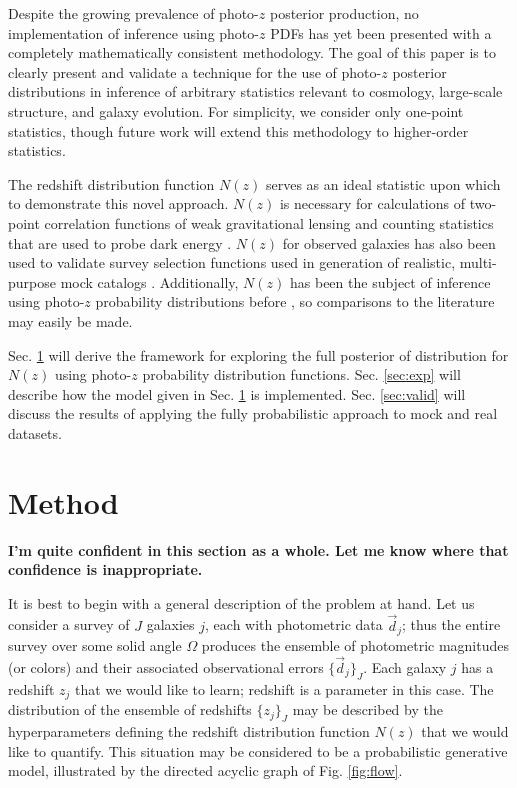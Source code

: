 \documentclass[preprint]{aastex}
\begin{document}
Despite the growing prevalence of photo-$z$ posterior production, no 
implementation of inference using photo-$z$ PDFs has yet been presented with a 
completely mathematically consistent methodology.  The goal of this paper is to 
clearly present and validate a technique for the use of photo-$z$ posterior 
distributions in inference of arbitrary statistics relevant to cosmology, 
large-scale structure, and galaxy evolution.  For simplicity, we consider only 
one-point statistics, though future work will extend this methodology to 
higher-order statistics.

The redshift distribution function $N(z)$ serves as an ideal statistic upon 
which to demonstrate this novel approach.  $N(z)$ is necessary for calculations 
of two-point correlation functions of weak gravitational lensing and counting 
statistics that are used to probe dark energy \citep{Masters2015}.  $N(z)$ for 
observed galaxies has also been used to validate survey selection functions 
used in generation of realistic, multi-purpose mock catalogs 
\citep{Norberg2002}.  Additionally, $N(z)$ has been the subject of inference 
using photo-$z$ probability distributions before \citep{Sheldon2012, 
Hildebrandt2012, Kelly2014, Benjamin2013, Bonnett2015a, Viironen2015, 
Asorey2016, Leistedt2016}, so comparisons to the literature may easily be made. 
 

Sec. \ref{sec:meth} will derive the framework for exploring the full posterior 
of distribution for $N(z)$ using photo-$z$ probability distribution functions.  
Sec. \ref{sec:exp} will describe how the model given in Sec. \ref{sec:meth} is 
implemented.  Sec. \ref{sec:valid} will discuss the results of applying the 
fully probabilistic approach to mock and real datasets.

\clearpage
\section{Method}
\label{sec:meth}

\textbf{I'm quite confident in this section as a whole.  Let me know where that 
confidence is inappropriate.}

It is best to begin with a general description of the problem at hand.  Let us 
consider a survey of $J$ galaxies $j$, each with photometric data 
$\vec{d}_{j}$; thus the entire survey over some solid angle $\Omega$ produces 
the ensemble of photometric magnitudes (or colors) and their associated 
observational errors $\{\vec{d}_{j}\}_{J}$.  Each galaxy $j$ has a redshift 
$z_{j}$ that we would like to learn; redshift is a parameter in this case.  The 
distribution of the ensemble of redshifts $\{z_{j}\}_{J}$ may be described by 
the hyperparameters defining the redshift distribution function $N(z)$ that we 
would like to quantify.  This situation may be considered to be a probabilistic 
generative model, illustrated by the directed acyclic graph of Fig. 
\ref{fig:flow}.  
\end{document}
